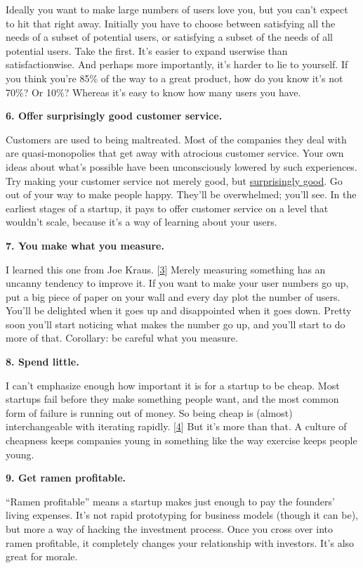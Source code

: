 Ideally you want to make large numbers of users love you, but you can't
expect to hit that right away. Initially you have to choose between
satisfying all the needs of a subset of potential users, or satisfying a
subset of the needs of all potential users. Take the first. It's easier
to expand userwise than satisfactionwise. And perhaps more importantly,
it's harder to lie to yourself. If you think you're 85\% of the way to a
great product, how do you know it's not 70\%? Or 10\%? Whereas it's easy
to know how many users you have.

\textbf{6. Offer surprisingly good customer service.}

Customers are used to being maltreated. Most of the companies they deal
with are quasi-monopolies that get away with atrocious customer service.
Your own ideas about what's possible have been unconsciously lowered by
such experiences. Try making your customer service not merely good, but
\href{http://www.diaryofawebsite.com/blog/2008/07/wufoo-and-the-art-of-customer-service/}{surprisingly
good}. Go out of your way to make people happy. They'll be overwhelmed;
you'll see. In the earliest stages of a startup, it pays to offer
customer service on a level that wouldn't scale, because it's a way of
learning about your users.

\textbf{7. You make what you measure.}

I learned this one from Joe Kraus. {[}\hyperref[f3n]{3}{]} Merely
measuring something has an uncanny tendency to improve it. If you want
to make your user numbers go up, put a big piece of paper on your wall
and every day plot the number of users. You'll be delighted when it goes
up and disappointed when it goes down. Pretty soon you'll start noticing
what makes the number go up, and you'll start to do more of that.
Corollary: be careful what you measure.

\textbf{8. Spend little.}

I can't emphasize enough how important it is for a startup to be cheap.
Most startups fail before they make something people want, and the most
common form of failure is running out of money. So being cheap is
(almost) interchangeable with iterating rapidly. {[}\hyperref[f4n]{4}{]}
But it's more than that. A culture of cheapness keeps companies young in
something like the way exercise keeps people young.

\textbf{9. Get ramen profitable.}

``Ramen profitable'' means a startup makes just enough to pay the
founders' living expenses. It's not rapid prototyping for business
models (though it can be), but more a way of hacking the investment
process. Once you cross over into ramen profitable, it completely
changes your relationship with investors. It's also great for morale.

